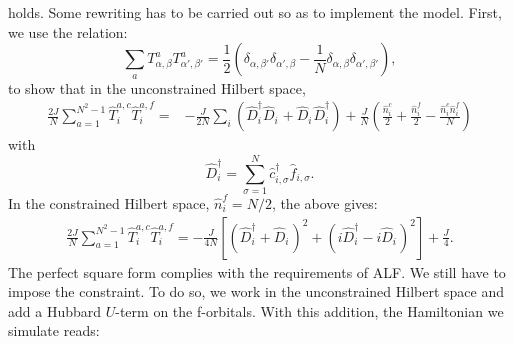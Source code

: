 holds. Some rewriting has to be carried out so as to implement  the model.
First, we  use the  relation:
\begin{equation*}
	\sum_{a} T^{a}_{\alpha,\beta} T^{a}_{\alpha',\beta'} = \frac{1}{2} \left(  \delta_{\alpha,\beta'}  \delta_{\alpha',\beta} - \frac{1}{N} \delta_{\alpha,\beta} \delta_{\alpha', \beta'} \right), 
\end{equation*}
to  show that  in the unconstrained Hilbert space,
\begin{align}
	 \frac{2 J}{N} \sum_{ a=1  }^{N^2 -1}  \hat{T}^{a,c}_{i}  \hat{T}^{a,f}_{i}   = &   - \frac{J}{2N} \sum_{i}  \left( 
                \hat{D}^{\dagger}_{i} \hat{D}^{\phantom\dagger}_{i}   +    \hat{D}^{\phantom\dagger}_{i} \hat{D}^{\dagger}_{i}    \right)    + \frac{J}{N}   \left(   \frac{\hat{n}^{c}_i}{2}  + \frac{\hat{n}^{f}_i}{2} -  \frac{\hat{n}^{c}_i \hat{n}^{f}_i}{N}   \right) \nonumber 
 \end{align}
with
\begin{equation*}
	   \hat{D}^{\dagger}_{i}   =  \sum_{\sigma=1}^{N} \hat{c}^{\dagger}_{i,\sigma}  \hat{f}^{\phantom\dagger}_{i,\sigma}.
\end{equation*}
In the constrained Hilbert space, $\hat{n}^{f}_i = N/2 $, the above gives:
\begin{align}
	 \frac{2 J}{N} \sum_{ a=1  }^{N^2 -1}  \hat{T}^{a,c}_{i}  \hat{T}^{a,f}_{i}   =     -  \frac{J}{4N}    \left[ \left(   \hat{D}^{\dagger}_{i}  + \hat{D}^{\phantom\dagger}_{i}    \right)^{2}  + 
                                                       \left(  i\hat{D}^{\dagger}_{i}  - i  \hat{D}^{\phantom\dagger}_{i}    \right)^2  \right] + \frac{J}{4}.  
 \end{align}
The perfect square form complies with the requirements of ALF.
We still have to impose the constraint.
To do so, we work in the unconstrained Hilbert space and add a Hubbard  $U$-term on  the f-orbitals.
With this addition, the Hamiltonian we simulate reads: 

